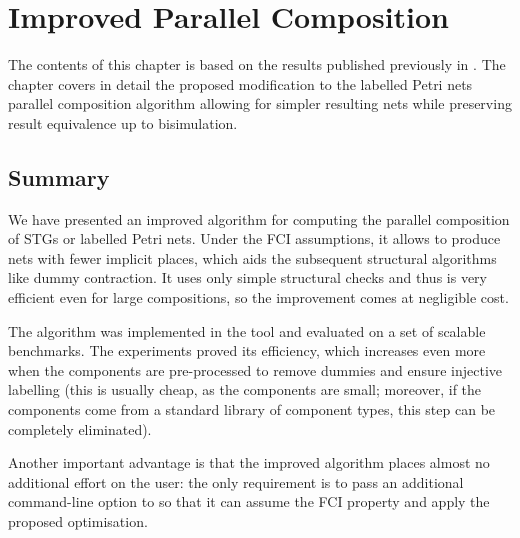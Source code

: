\chapter{Improved Parallel Composition}

\label{chap:ParComp}

The contents of this chapter is based on the results published previously in \cite{improved_par_comp}. The chapter covers in detail the proposed modification to the labelled Petri nets parallel composition algorithm allowing for simpler resulting nets while preserving result equivalence up to bisimulation.






\section{Summary}

We have presented an improved algorithm for computing the
parallel composition of STGs or labelled Petri nets. Under the
FCI assumptions, it allows to produce nets with fewer implicit
places, which aids the subsequent structural algorithms like
dummy contraction. It uses only simple structural checks and
thus is very efficient even for large compositions, so the
improvement comes at negligible cost.

The algorithm was implemented in the \pcomp tool and evaluated
on a set of scalable benchmarks. The experiments proved its
efficiency, which increases even more when the components are
pre-processed to remove dummies and ensure injective labelling
(this is usually cheap, as the components are small; moreover,
if the components come from a standard library of component
types, this step can be completely eliminated).

Another important advantage is that the improved algorithm
places almost no additional effort on the user: the only
requirement is to pass an additional command-line option to
\pcomp so that it can assume the FCI property and apply the
proposed optimisation.
